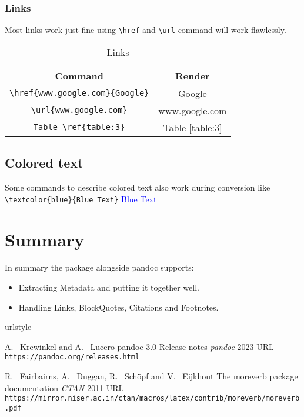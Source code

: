 \subsubsection{Links}
Most links work just fine using \verb|\href| and \verb|\url| command will work flawlessly.
\begin{table}[htbp]
\centering
\begin{tabular}{| c | c |}
 \hline
 Command & Render \\
 \hline
 \verb|\href{www.google.com}{Google}| & \href{www.google.com}{Google} \\ \hline
\verb|\url{www.google.com}| & \url{www.google.com}  \\ \hline
\verb|Table \ref{table:3}| & Table \ref{table:3}  \\ \hline
\end{tabular}
\caption{Links}
\label{table:4}
\end{table}

\subsection{Colored text}
Some commands to describe colored text also work during conversion like
\verb|\textcolor{blue}{Blue Text}|  \textcolor{blue}{Blue Text}

\section{Summary}
In summary the  package alongside pandoc supports:
\begin{itemize}
\item Extracting Metadata and putting it together well.
\item Handling Links, BlockQuotes, Citations and Footnotes.
\end{itemize}

\begin{thebibliography}{2}
    \providecommand{\natexlab}[1]{#1}
    \providecommand{\url}[1]{\texttt{#1}}
    \expandafter\ifx\csname urlstyle\endcsname\relax
      \providecommand{\doi}[1]{doi: #1}\else
      \providecommand{\doi}{doi: \begingroup \urlstyle{rm}\Url}\fi

A.~ Krewinkel and A.~ Lucero
\newblock pandoc 3.0 Release notes
\newblock \emph{pandoc}  2023
\newblock URL \url{https://pandoc.org/releases.html}

R.~ Fairbairns, A.~ Duggan, R.~ Schöpf and V.~ Eijkhout
\newblock The moreverb package documentation
\newblock \emph{CTAN}  2011
\newblock URL \url{https://mirror.niser.ac.in/ctan/macros/latex/contrib/moreverb/moreverb.pdf}

\end{thebibliography}


\address{%
Abhishek Ulayil\\
Institute of Actuaries of India (Student)\\%
Mumbai, India\\
ORCiD: 0009-0000-6935-8690\\
}
